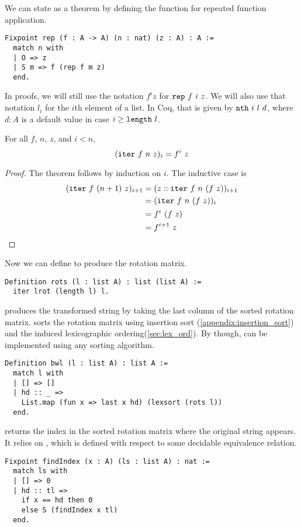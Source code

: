 \documentclass[sigplan,10pt,anonymous,review]{thesis}
\begin{document}
We can state  as a theorem by defining the
function  for repeated function application.
\begin{lstlisting}
Fixpoint rep (f : A -> A) (n : nat) (z : A) : A :=
  match n with
  | O => z
  | S m => f (rep f m z)
  end.
\end{lstlisting}
In proofs, we will still use the notation $f^i z$ for
$\texttt{\textup{rep}}~f~i~z$. We will also use that notation $l_i$ for the $i$th
element of a list. In Coq, that is given by $\texttt{\textup{nth}}~i~l~d$, where
$d:A$ is a default value in case $i \ge \texttt{\textup{length}}~l$.

\begin{theorem}
  For all $f$, $n$, $z$, and $i < n$,
  \begin{equation*}
    (\texttt{\textup{iter}}~f~n~z)_i = f^i~z
  \end{equation*}
\end{theorem}
\begin{proof}
  The theorem follows by induction on $i$. The inductive case is
  \begin{align*}
       (\texttt{\textup{iter}}~f~(n+1)~z)_{i+1}
    &= (z :: \texttt{\textup{iter}}~f~n~(f~z))_{i+1} \\
    &= (\texttt{\textup{iter}}~f~n~(f~z))_i \\
    &= f^i~(f~z) \\
    &= f^{i+1}~z \qedhere
  \end{align*}
\end{proof}

Now we can define  to produce the rotation matrix.
\begin{lstlisting}
Definition rots (l : list A) : list (list A) :=
  iter lrot (length l) l.
\end{lstlisting}

 produces the transformed string by taking the last column of
the sorted rotation matrix.  sorts the rotation matrix
using insertion sort (\cref{appendix:insertion_sort}) and the induced
lexicographic ordering(\cref{sec:lex_ord}). By
 though,  can be implemented
using any sorting algorithm.
\begin{lstlisting}
Definition bwl (l : list A) : list A :=
  match l with
  | [] => []
  | hd :: _ =>
    List.map (fun x => last x hd) (lexsort (rots l))
  end.
\end{lstlisting}

 returns the index in the sorted rotation matrix where the
original string appears. It relies on , which is
defined with respect to some decidable equivalence relation.
\begin{lstlisting}
Fixpoint findIndex (x : A) (ls : list A) : nat :=
  match ls with
  | [] => 0
  | hd :: tl =>
    if x == hd then 0
    else S (findIndex x tl)
  end.
\end{lstlisting}
\end{document}
